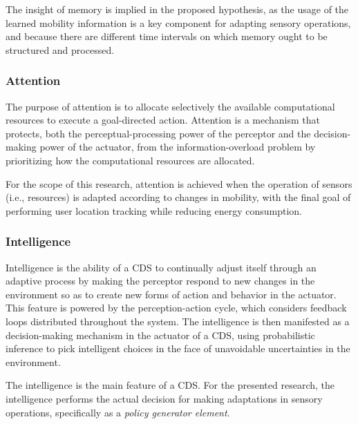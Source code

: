 \documentclass[ENG,PhD]{cinvestav}
\begin{document}
The insight of memory is implied in the proposed hypothesis, as the usage of the learned mobility information is a key component for adapting sensory operations, and because there are different time intervals on which memory ought to be structured and processed.

\subsubsection*{Attention}
The purpose of attention is to allocate selectively the available computational resources to execute a goal-directed action.
Attention is a mechanism that protects, both the perceptual-processing power of the perceptor and the decision-making power of the actuator, from the information-overload problem by prioritizing how the computational resources are allocated.

For the scope of this research, attention is achieved when the operation of sensors (i.e., resources) is adapted according to changes in mobility, with the final goal of performing user location tracking while reducing energy consumption.

\subsubsection*{Intelligence}
Intelligence is the ability of a CDS to continually adjust itself through an adaptive process by making the perceptor respond to new changes in the environment so as to create new forms of action and behavior in the actuator.
This feature is powered by the perception-action cycle, which considers feedback loops distributed throughout the system.
The intelligence is then manifested as a decision-making mechanism in the actuator of a CDS, using probabilistic inference to pick intelligent choices in the face of unavoidable uncertainties in the environment.

The intelligence is the main feature of a CDS.
For the presented research, the intelligence performs the actual decision for making adaptations in sensory operations, specifically as a \emph{policy generator element}.

\end{document}
